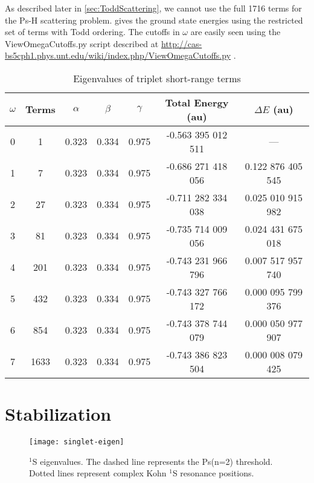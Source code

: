 \documentclass[Dissertation.tex]{subfiles}
\begin{document}
As described later in \cref{sec:ToddScattering}, we cannot use the full 1716 terms for the Ps-H scattering problem.  gives the ground state energies using the restricted set of terms with Todd ordering. The cutoffs in $\omega$ are easily seen using the ViewOmegaCutoffs.py script described at \url{http://cas-bs5cph1.phys.unt.edu/wiki/index.php/ViewOmegaCutoffs.py} \cite{Wiki}.

\setlength{\abovecaptionskip}{6pt}   %
\setlength{\belowcaptionskip}{6pt}   %
\begin{table}[H]
\centering
\begin{tabular}{c c c c c c c}
\toprule
$\omega$ & Terms & $\alpha$ & $\beta$ & $\gamma$ & Total Energy (au) & $\Delta E$ (au) \\ [0.5ex]
\midrule
0 & 1    & 0.323 & 0.334 & 0.975 & -0.563 395 012 511 & --- \\
1 & 7    & 0.323 & 0.334 & 0.975 & -0.686 271 418 056 & 0.122 876 405 545 \\
2 & 27   & 0.323 & 0.334 & 0.975 & -0.711 282 334 038 & 0.025 010 915 982 \\
3 & 81   & 0.323 & 0.334 & 0.975 & -0.735 714 009 056 & 0.024 431 675 018 \\
4 & 201  & 0.323 & 0.334 & 0.975 & -0.743 231 966 796 & 0.007 517 957 740 \\
5 & 432  & 0.323 & 0.334 & 0.975 & -0.743 327 766 172 & 0.000 095 799 376 \\
6 & 854  & 0.323 & 0.334 & 0.975 & -0.743 378 744 079 & 0.000 050 977 907 \\
7 & 1633 & 0.323 & 0.334 & 0.975 & -0.743 386 823 504 & 0.000 008 079 425 \\
\bottomrule
\end{tabular}
\caption{Eigenvalues of triplet short-range terms} %
\label{tab:BoundEnergyTodd3}
\end{table}


\section{Stabilization}


\begin{figure}[H]
	\centering
	\texttt{[image: singlet-eigen]}
	\caption{$^1$S eigenvalues. The dashed line represents the Ps(n=2) threshold. Dotted lines represent complex Kohn $^1$S resonance positions.}
	\label{fig:singlet-eigen}
\end{figure}
\end{document}
